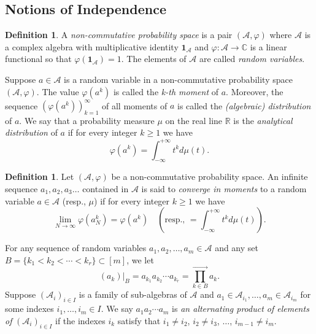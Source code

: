\documentclass[a4paper,12pt]{extarticle}
\theoremstyle{definition}
\newtheorem{defn}[thm]{Definition}
\theoremstyle{remark}
\def\AA{\mathcal{A}}
\begin{document}
\subsection{Notions of Independence}
%
%
%
\begin{defn}
	A \emph{non-commutative probability space} is a pair $(\AA,\varphi)$ where $\AA$ is a complex algebra with multiplicative identity $\mathbf{1}_\AA$ and $\varphi:\AA\to\mathbb{C}$ is a linear functional so that $\varphi(\mathbf{1}_\AA)=1$. 
    The elements of $\mathcal{A}$ are called \emph{random variables}. 
\end{defn}
%
%
%
%
%

%
Suppose $a \in \AA$ is a random variable in a non-commutative probability space $(\AA,\varphi)$. 
%
The value $\varphi(a^k)$ is called the \emph{k-th moment} of $a$. %
%
Moreover, the sequence $(\varphi(a^k))_{k=1}^\infty$ of all moments of $a$ is called the \emph{(algebraic) distribution} of $a$. 
%
We say that a probability measure $\mu$ on the real line $\mathbb{R}$ is the   \emph{analytical distribution} of $a$ if for every integer $k\geq 1$ we have 
%
\[
\varphi(a^k) = \int_{- \infty}^{+\infty} t^k d\mu(t). 
\]
%
%
%
%

%
\begin{defn}
    Let $(\AA,\varphi)$ be a non-commutative probability space. 
    An infinite sequence $a_1, a_2, a_3 \ldots $ contained in $\AA$ is said to \emph{converge in moments} to a random variable $a \in \AA$ (resp., $\mu$) if for every integer $k\geq 1$ we have 
    \[
    \lim_{N \to \infty} \varphi(a^k_N) = \varphi(a^k) 
    \quad \left(\text{resp., } =\int_{- \infty}^{+\infty} t^k d\mu(t) \right)  .  
    \]
\end{defn}
%
%
%
%
%

For any sequence of random variables  $a_1,a_2,\ldots,a_m \in \mathcal{A}$  and any set $B = \{k_1 < k_2 < \cdots < k_r \} \subset [m] $, we let
%
\[
(a_k)|_B = a_{k_1} a_{k_2} \cdots a_{k_r} = \prod_{k \in B}^{\rightarrow} a_k .
\]
%
Suppose $(\mathcal{A}_i)_{i \in I}$ is a family of sub-algebras of $\AA$ and $a_1 \in \AA_{i_1},\ldots, a_m\in \AA_{i_m}$ for some indexes $i_1,\ldots,i_m \in I$. 
%
We say $a_1 a_2 \cdots a_m$ is \emph{an alternating product of elements of} $(\mathcal{A}_i)_{i \in I}$ if the indexes $i_k$ satisfy that $i_1 \neq i_2$, $i_2 \neq i_3$, $\ldots$, $i_{m-1} \neq i_m$. 
%
%
%
\end{document}
